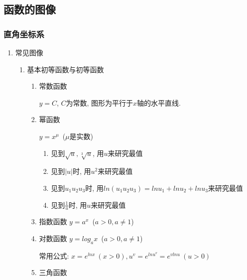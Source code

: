 \subsection{函数的图像}
\subsubsection{直角坐标系}
\begin{enumerate}
    \item 常见图像
          \begin{enumerate}
              \item 基本初等函数与初等函数
                    \begin{enumerate}
                        \item 常数函数\par
                              $ y=C $, $ C $为常数, 图形为平行于$ x $轴的水平直线.
                        \item 幂函数\par
                              $ y=x^{\mu} $\ ($ \mu $是实数)
                              \begin{tcolorbox}
                                  \begin{enumerate}
                                      \item 见到$ \sqrt{u},\sqrt[3]{u} $, 用$ u $来研究最值
                                      \item 见到$ |u| $时, 用$ u^{2} $来研究最值
                                      \item 见到$ u_{1}u_{2}u_{3} $时, 用$ ln(u_{1}u_{2}u_{3})=lnu_{1}+lnu_{2}+lnu_{3} $来研究最值
                                      \item 见到$ \frac{1}{u} $时, 用$ u $来研究最值
                                  \end{enumerate}
                              \end{tcolorbox}
                        \item 指数函数
                              $ y=a^{x} $\ ($ a>0,a\neq 1 $)
                        \item 对数函数
                              $ y=log_{a}x $\ ($ a>0,a\neq 1 $)
                              \begin{tcolorbox}
                                  常用公式: $ x=e^{lnx}\ (x>0), u^{v}=e^{lnu^{v}}=e^{vlnu}\ (u>0) $
                              \end{tcolorbox}
                        \item 三角函数

\end{enumerate}
\end{enumerate}
\end{enumerate}
